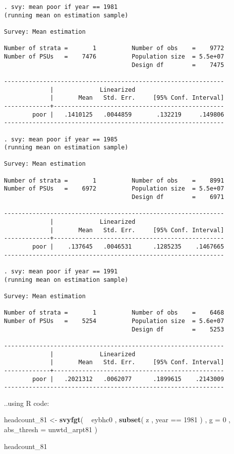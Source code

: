 \documentclass[]{book}
\newenvironment{Shaded}{\begin{snugshade}}{\end{snugshade}}
\newcommand{\KeywordTok}[1]{\textcolor[rgb]{0.13,0.29,0.53}{\textbf{{#1}}}}
\newcommand{\DataTypeTok}[1]{\textcolor[rgb]{0.13,0.29,0.53}{{#1}}}
\newcommand{\DecValTok}[1]{\textcolor[rgb]{0.00,0.00,0.81}{{#1}}}
\newcommand{\StringTok}[1]{\textcolor[rgb]{0.31,0.60,0.02}{{#1}}}
\newcommand{\NormalTok}[1]{{#1}}
\theoremstyle{definition}
\theoremstyle{definition}
\theoremstyle{remark}
\begin{document}
\begin{verbatim}
. svy: mean poor if year == 1981
(running mean on estimation sample)

Survey: Mean estimation

Number of strata =       1          Number of obs    =    9772
Number of PSUs   =    7476          Population size  = 5.5e+07
                                    Design df        =    7475

--------------------------------------------------------------
             |             Linearized
             |       Mean   Std. Err.     [95% Conf. Interval]
-------------+------------------------------------------------
        poor |   .1410125   .0044859       .132219     .149806
--------------------------------------------------------------

. svy: mean poor if year == 1985
(running mean on estimation sample)

Survey: Mean estimation

Number of strata =       1          Number of obs    =    8991
Number of PSUs   =    6972          Population size  = 5.5e+07
                                    Design df        =    6971

--------------------------------------------------------------
             |             Linearized
             |       Mean   Std. Err.     [95% Conf. Interval]
-------------+------------------------------------------------
        poor |    .137645   .0046531      .1285235    .1467665
--------------------------------------------------------------

. svy: mean poor if year == 1991
(running mean on estimation sample)

Survey: Mean estimation

Number of strata =       1          Number of obs    =    6468
Number of PSUs   =    5254          Population size  = 5.6e+07
                                    Design df        =    5253

--------------------------------------------------------------
             |             Linearized
             |       Mean   Std. Err.     [95% Conf. Interval]
-------------+------------------------------------------------
        poor |   .2021312   .0062077      .1899615    .2143009
--------------------------------------------------------------
\end{verbatim}

..using R code:

\begin{Shaded}
\begin{Highlighting}[]
\NormalTok{headcount_81 <-}\StringTok{ }
\StringTok{    }\KeywordTok{svyfgt}\NormalTok{( }
        \NormalTok{~}\StringTok{ }\NormalTok{eybhc0 , }
        \KeywordTok{subset}\NormalTok{( z , year ==}\StringTok{ }\DecValTok{1981} \NormalTok{) , }
        \DataTypeTok{g =} \DecValTok{0} \NormalTok{, }
        \DataTypeTok{abs_thresh =} \NormalTok{unwtd_arpt81}
    \NormalTok{)}

\NormalTok{headcount_81}
\end{Highlighting}
\end{Shaded}
\end{document}
